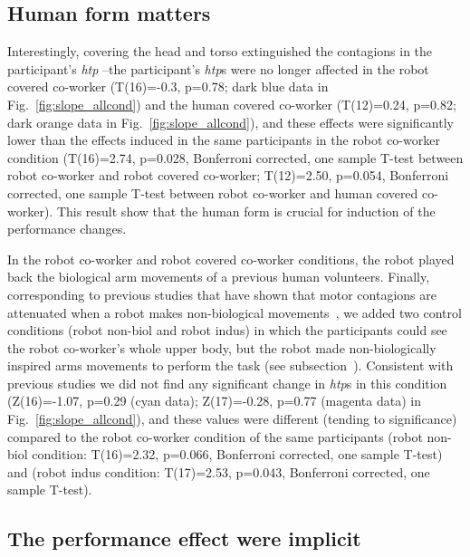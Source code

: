 \subsection{Human form matters}

Interestingly, covering the head and torso extinguished the contagions in the participant's {\it htp} --the participant's {\it htp}s were no longer affected in the robot covered co-worker (T(16)=-0.3, p=0.78; dark blue data in Fig.~\ref{fig:slope_allcond}) and the human covered co-worker (T(12)=0.24, p=0.82; dark orange data in Fig.~\ref{fig:slope_allcond}), and these effects were significantly lower than the effects induced in the same participants in the robot co-worker condition (T(16)=2.74, p=0.028, Bonferroni corrected, one sample T-test between robot co-worker and robot covered co-worker; T(12)=2.50, p=0.054, Bonferroni corrected, one sample T-test between robot co-worker and human covered co-worker). This result show that the human form is crucial for induction of the performance changes.

In the robot co-worker and robot covered co-worker conditions, the robot played back the biological arm movements of a previous human volunteers. Finally, corresponding to previous studies that have shown that motor contagions are attenuated when a robot makes non-biological movements~\cite{Kilner:CurBio:2003,Bisio:PlosOne:2014}, we added two control conditions (robot non-biol and robot indus) in which the participants could see the robot co-worker's whole upper body, but the robot made non-biologically inspired arms movements to perform the task (see subsection~). Consistent with previous studies we did not find any significant change in {\it htp}s in this condition (Z(16)=-1.07, p=0.29 (cyan data); Z(17)=-0.28, p=0.77 (magenta data) in Fig.~\ref{fig:slope_allcond}), and these values were different (tending to significance) compared to the robot co-worker condition of the same participants (robot non-biol condition: T(16)=2.32, p=0.066, Bonferroni corrected, one sample T-test) and (robot indus condition: T(17)=2.53, p=0.043, Bonferroni corrected, one sample T-test).


\subsection{The performance effect were implicit} \label{questionnaire}

